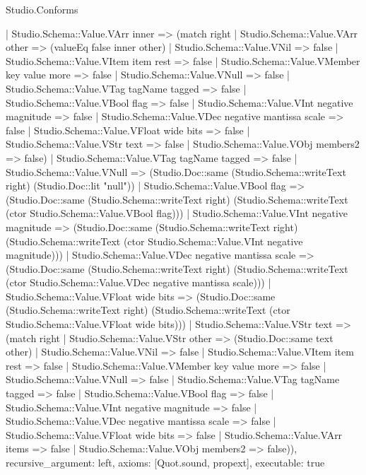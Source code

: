 \begin{lexlean}{Studio.Conforms}
\begin{semanticmodule}
{    | Studio.Schema::Value.VArr inner => (match right
      | Studio.Schema::Value.VArr other => (valueEq false inner other)
      | Studio.Schema::Value.VNil => false
      | Studio.Schema::Value.VItem item rest => false
      | Studio.Schema::Value.VMember key value more => false
      | Studio.Schema::Value.VNull => false
      | Studio.Schema::Value.VTag tagName tagged => false
      | Studio.Schema::Value.VBool flag => false
      | Studio.Schema::Value.VInt negative magnitude => false
      | Studio.Schema::Value.VDec negative mantissa scale => false
      | Studio.Schema::Value.VFloat wide bits => false
      | Studio.Schema::Value.VStr text => false
      | Studio.Schema::Value.VObj members2 => false)
    | Studio.Schema::Value.VTag tagName tagged => false
    | Studio.Schema::Value.VNull => (Studio.Doc::same (Studio.Schema::writeText right) (Studio.Doc::lit "null"))
    | Studio.Schema::Value.VBool flag => (Studio.Doc::same (Studio.Schema::writeText right) (Studio.Schema::writeText (ctor Studio.Schema::Value.VBool flag)))
    | Studio.Schema::Value.VInt negative magnitude => (Studio.Doc::same (Studio.Schema::writeText right) (Studio.Schema::writeText (ctor Studio.Schema::Value.VInt negative magnitude)))
    | Studio.Schema::Value.VDec negative mantissa scale => (Studio.Doc::same (Studio.Schema::writeText right) (Studio.Schema::writeText (ctor Studio.Schema::Value.VDec negative mantissa scale)))
    | Studio.Schema::Value.VFloat wide bits => (Studio.Doc::same (Studio.Schema::writeText right) (Studio.Schema::writeText (ctor Studio.Schema::Value.VFloat wide bits)))
    | Studio.Schema::Value.VStr text => (match right
      | Studio.Schema::Value.VStr other => (Studio.Doc::same text other)
      | Studio.Schema::Value.VNil => false
      | Studio.Schema::Value.VItem item rest => false
      | Studio.Schema::Value.VMember key value more => false
      | Studio.Schema::Value.VNull => false
      | Studio.Schema::Value.VTag tagName tagged => false
      | Studio.Schema::Value.VBool flag => false
      | Studio.Schema::Value.VInt negative magnitude => false
      | Studio.Schema::Value.VDec negative mantissa scale => false
      | Studio.Schema::Value.VFloat wide bits => false
      | Studio.Schema::Value.VArr items => false
      | Studio.Schema::Value.VObj members2 => false)),
  recursive_argument: left,
  axioms: [Quot.sound, propext],
  executable: true
}


\end{semanticmodule}
\end{lexlean}
